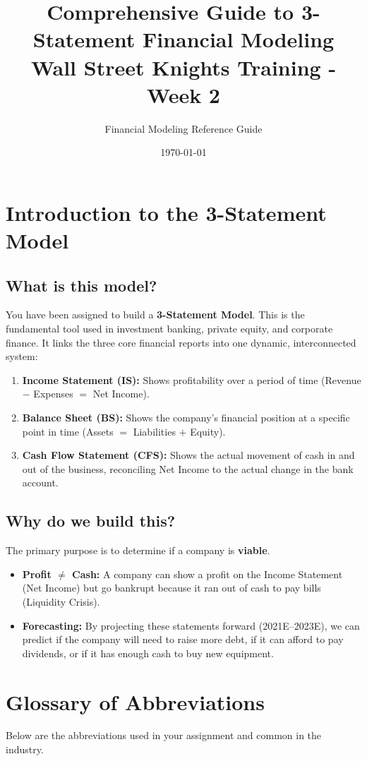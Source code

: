 \documentclass[11pt, letterpaper]{article}
\title{\textbf{Comprehensive Guide to 3-Statement Financial Modeling}\\ \large Wall Street Knights Training - Week 2}
\author{Financial Modeling Reference Guide}
\date{\today}
\begin{document}
\maketitle
\tableofcontents
\newpage

\section{Introduction to the 3-Statement Model}

\subsection{What is this model?}
You have been assigned to build a \textbf{3-Statement Model}. This is the fundamental tool used in investment banking, private equity, and corporate finance. It links the three core financial reports into one dynamic, interconnected system:

\begin{enumerate}
    \item \textbf{Income Statement (IS):} Shows profitability over a period of time (Revenue $-$ Expenses $=$ Net Income).
    \item \textbf{Balance Sheet (BS):} Shows the company's financial position at a specific point in time (Assets $=$ Liabilities $+$ Equity).
    \item \textbf{Cash Flow Statement (CFS):} Shows the actual movement of cash in and out of the business, reconciling Net Income to the actual change in the bank account.
\end{enumerate}

\subsection{Why do we build this?}
The primary purpose is to determine if a company is \textbf{viable}.
\begin{itemize}
    \item \textbf{Profit $\neq$ Cash:} A company can show a profit on the Income Statement (Net Income) but go bankrupt because it ran out of cash to pay bills (Liquidity Crisis).
    \item \textbf{Forecasting:} By projecting these statements forward (2021E--2023E), we can predict if the company will need to raise more debt, if it can afford to pay dividends, or if it has enough cash to buy new equipment.
\end{itemize}

\section{Glossary of Abbreviations}
Below are the abbreviations used in your assignment and common in the industry.
\end{document}
